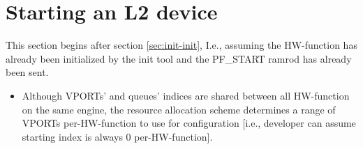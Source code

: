 \documentclass[11pt,fleqn,hidelinks,oneside]{book} %
\newcommand{\insertcode}[2]{\begin{itemize}\item[]\end{itemize}} %
\newcommand{\ChapterFuncs}{}
\newcommand{\silentfunc}[1]
{\expandafter\def\expandafter\ChapterFuncs\expandafter{\ChapterFuncs { } \insertcode{snippets/#1_generated.h}{}}}
\newenvironment{NOTICE}
  {\par\begin{mdframed}[style=MyMdStyle,outerlinecolor=black,%
  						linecolor=black, outerlinewidth=1.5pt]%
    \begin{itemize}{}{\leftmargin=1cm
                   \labelwidth=\leftmargin}\item[\Large\Info]}
  {\end{itemize}\end{mdframed}\par}
\begin{document}
\section{Starting an L2 device}
\label{sec:l2-start}
This section begins after section \ref{sec:init-init}, I.e., assuming the HW-function has already been initialized by the init tool and the PF\_START ramrod has already been sent.

	\begin{NOTICE}
	Although VPORTs' and queues' indices are shared between all HW-function on the same engine, the resource allocation scheme determines a range of VPORTs per-HW-function to use for configuration [i.e., developer can assume starting index is always 0 per-HW-function].
	\end{NOTICE}


\silentfunc{sp_vport_start}
\silentfunc{eth_rx_queue_start}
\silentfunc{eth_tx_queue_start}
\silentfunc{sp_vport_update}
\end{document}
